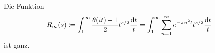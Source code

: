 \begin{frame}
    \begin{lemma}
        Die Funktion 
        \[
            R_\infty(s) \coloneqq \int_1^\infty \frac{\theta(it)-1}{2} t^{s/2} \frac{\mathrm{d} t}{t} = \int_1^\infty \sum_{n=1}^\infty e^{-\pi n^2 t} t^{s/2} \frac{\mathrm{d} t}{t}
        \] ist ganz.
    \end{lemma}
\end{frame}